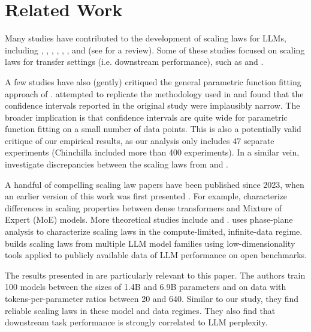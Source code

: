 \documentclass{article}
\theoremstyle{plain}
\theoremstyle{definition}
\theoremstyle{remark}
\begin{document}
\section{Related Work}


Many studies have contributed to the development of scaling laws for LLMs, including \citet{hestness2017deep, hestness2019beyond},  \citet{rosenfeld2019constructive}, \citet{henighan2020scaling}, \citet{scalinglaws}, \citet{sorscher2022beyond}, \citet{tay2022scaling}, and \citet{caballero2022broken} (see \citet{villalobos2023scaling} for a review). Some of these studies focused on scaling laws for transfer settings (i.e. downstream performance), such as \citet{hernandez2021scaling,mikami2021scaling,abnar2021exploring} and \citet{tay2022scaling}.

A few studies have also (gently) critiqued the general parametric function fitting approach of \citet{chinchilla}. \citet{besiroglu2024chinchilla} attempted to replicate the methodology used in \citet{chinchilla} and found that the confidence intervals reported in the original study were implausibly narrow. The broader implication is that confidence intervals are quite wide for parametric function fitting on a small number of data points. This is also a potentially valid critique of our empirical results, as our analysis only includes 47 separate experiments (Chinchilla included more than 400 experiments). In a similar vein, \citet{porian2024resolving} investigate discrepancies between the scaling laws from \citet{scalinglaws} and \citet{chinchilla}.

A handful of compelling scaling law papers have been published since 2023, when an earlier version of this work was first presented \cite{sardana2023beyond}. For example, \citet{krajewski2024scaling}  characterize differences in scaling properties between dense transformers and Mixture of Expert (MoE) models. More theoretical studies include \citet{michaud2024quantization} and \citet{bordelon2024dynamical}.
\citet{paquette20244+} uses phase-plane analysis to characterize scaling laws in the compute-limited, infinite-data regime. 
\citet{ruan2024observational} builds scaling laws from multiple LLM model families using low-dimensionality tools applied to publicly available data of LLM performance on open benchmarks.

The results presented in \citet{gadre2024language} are particularly relevant to this paper. The authors train 100 models between the sizes of 1.4B and 6.9B parameters and on data with tokens-per-parameter ratios between 20 and 640. Similar to our study, they find reliable scaling laws in these model and data regimes. They also find that downstream task performance is strongly correlated to LLM perplexity.
\end{document}
